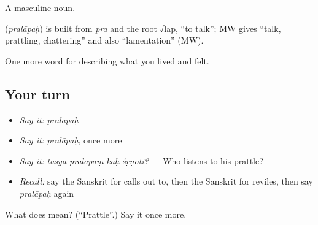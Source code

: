 A masculine noun.

\begin{cousinweb}
\textbf{} (\emph{pralāpaḥ}) is built from \emph{pra} and the root √lap, \textquotedblleft{}to talk\textquotedblright{}; MW gives \textquotedblleft{}talk, prattling, chattering\textquotedblright{} and also \textquotedblleft{}lamentation\textquotedblright{} (MW).
\end{cousinweb}

\begin{grammarlens}[title={What you've built}]
One more word for describing what you lived and felt.
\end{grammarlens}

\subsection*{Your turn}
\begin{itemize}
\raggedright
  \item \emph{Say it:} \emph{pralāpaḥ}
  \item \emph{Say it:} \emph{pralāpaḥ}, once more
  \item \emph{Say it:} \emph{tasya pralāpaṃ kaḥ śṛṇoti?} — Who listens to his prattle?
  \item \emph{Recall:} say the Sanskrit for calls out to, then the Sanskrit for reviles, then say \emph{pralāpaḥ} again
\end{itemize}

\begin{tcolorbox}[breakable,colback=teal!4,colframe=teal!35!black,title={Before you move on}]
What does  mean? (\textquotedblleft{}Prattle\textquotedblright{}.) Say it once more.
\end{tcolorbox}
